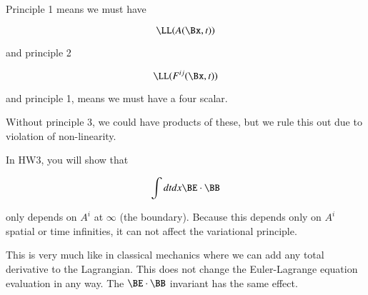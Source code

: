 Principle 1 means we must have

\begin{equation}\label{eqn:relativisticElectrodynamicsL12b:230}
\LL(A(\Bx, t))
\end{equation}

and principle 2

\begin{equation}\label{eqn:relativisticElectrodynamicsL12b:250}
\LL(F^{ij}(\Bx, t))
\end{equation}

and principle 1, means we must have a four scalar.

Without principle 3, we could have products of these, but we rule this out due to violation of non-linearity.


In HW3, you will show that

\begin{equation}\label{eqn:relativisticElectrodynamicsL12b:350}
\int dt dx \BE \cdot \BB
\end{equation}

only depends on \(A^i\) at \(\infty\) (the boundary).  Because this depends only on \(A^i\) spatial or time infinities, it can not affect the variational principle.

This is very much like in classical mechanics where we can add any total derivative to the Lagrangian.  This does not change the Euler-Lagrange equation evaluation in any way.  The \(\BE \cdot \BB\) invariant has the same effect.

